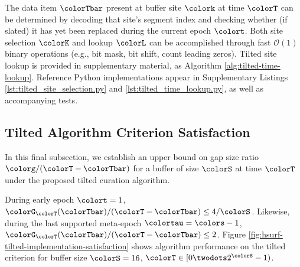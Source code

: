 The data item $\colorTbar$ present at buffer site $\colork$ at time $\colorT$ can be determined by decoding that site's segment index and checking whether (if slated) it has yet been replaced during the current epoch $\colort$.
Both site selection $\colorK$ and lookup $\colorL$ can be accomplished through fast $\mathcal{O}(1)$ binary operations (e.g., bit mask, bit shift, count leading zeros).
Tilted site lookup is provided in supplementary material, as Algorithm \ref{alg:tilted-time-lookup}.
Reference Python implementations appear in Supplementary Listings \ref{lst:tilted_site_selection.py} and \ref{lst:tilted_time_lookup.py}, as well as accompanying tests.

\subsection{Tilted Algorithm Criterion Satisfaction}
\label{sec:tilted-satisfaction}

In this final subsection, we establish an upper bound on gap size ratio $\colorg/(\colorT - \colorTbar)$ for a buffer of size $\colorS$ at time $\colorT$ under the proposed tilted curation algorithm.



During early epoch $\colort = 1$, $\colorG_{\colorT}(\colorTbar)/(\colorT - \colorTbar) \leq 4/\colorS$.
Likewise, during the last supported meta-epoch $\colortau = \colors - 1$, $\colorG_{\colorT}(\colorTbar)/(\colorT - \colorTbar) \leq 2$.
Figure \ref{fig:hsurf-tilted-implementation-satisfaction} shows algorithm performance on the tilted criterion for buffer size $\colorS=16$, $\colorT \in [0\twodots 2^{\colorS} - 1)$.
